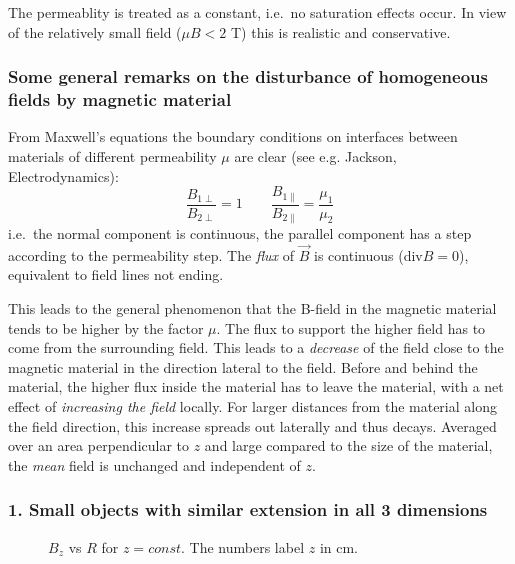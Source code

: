 \documentclass[12pt]{article}
\begin{document}
  The permeablity is treated as a constant, i.e.\ no saturation effects
occur. In view of the relatively small field ($\mu B < 2$ T) this is
realistic and conservative. 




\subsubsection*{Some general remarks on the disturbance of homogeneous
fields by magnetic material}

From Maxwell's equations the boundary conditions on %
interfaces between materials of different permeability $\mu$ are
clear (see e.g. Jackson, Electrodynamics):
\[ \frac{B_{1\perp}}{B_{2\perp}} = 1\quad\quad 
\frac{B_{1\parallel}}{B_{2\parallel}} = \frac{\mu_1}{\mu_2} \]
i.e.\ the normal component is continuous, the parallel component has a
step according to the permeability step. The {\em flux} of $\vec B$ is
continuous (div$B = 0$), equivalent to field lines not ending.
 
This leads to the general phenomenon that the B-field in the magnetic
material tends to be higher by the factor $\mu$. The flux to support the
higher field has to come from the surrounding field. This leads to a
{\em decrease} of the field close to the magnetic material in the
direction lateral to the field.  Before and behind the material, the
higher flux inside the material has to leave the material, with a net
effect of {\em increasing the field} locally. For larger distances from
the material along the field direction, this increase spreads out
laterally and thus decays.  Averaged over an area perpendicular to $z$
and large compared to the size of the material, the {\em mean} field is
unchanged and independent of $z$.


\subsubsection*{1. Small objects with similar extension in all 3
dimensions}

\begin{figure}[h]
\begin{center}
\parbox{150mm}{
\caption{$B_z$ vs $R$ for $z=const$. The numbers label $z$ in cm.}
}
\end{center} 
\end{figure}
\end{document}
